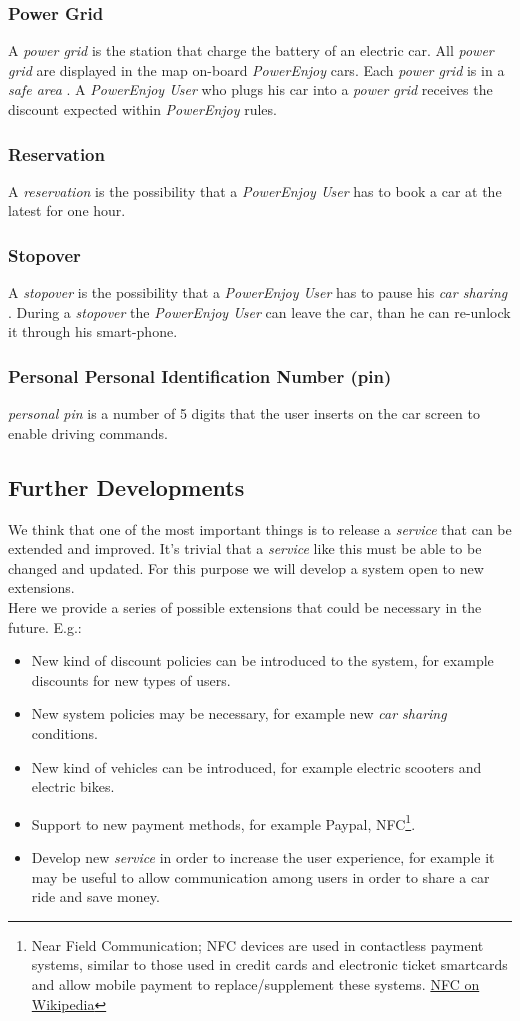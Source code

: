 \documentclass[english]{article}
\newcommand{\carsharing}{\textit {car sharing }}
\newcommand{\powerenjoy}{\textit{PowerEnjoy }}
\newcommand{\powerenjoyuser}{\textit{PowerEnjoy User }}
\newcommand{\service}{\textit{service }}
\newcommand{\safearea}{\textit{safe area }}
\newcommand{\powergrid}{\textit{power grid }}
\newcommand{\resevation}{\textit{reservation }}
\newcommand{\stopover}{\textit{stopover }}
\newcommand{\personalpin}{\textit{personal pin }}
\begin{document}
	\subsubsection{Power Grid}
		A \powergrid is the station that charge the battery of an electric car. All \powergrid are displayed in the map on-board \powerenjoy cars. Each \powergrid is in a \safearea. A \powerenjoyuser who plugs his car into a \powergrid receives the discount expected within \powerenjoy rules.
	\subsubsection{Reservation}
		A \resevation is the possibility that a \powerenjoyuser has to book a car at the latest for one hour.
	\subsubsection{Stopover}
		A \stopover is the possibility that a \powerenjoyuser has to pause his \carsharing. During a \stopover the \powerenjoyuser can leave the car, than he can re-unlock it through his smart-phone.
	\subsubsection{Personal  Personal Identification Number (pin)}
		 \personalpin is a number of 5 digits that the user inserts on the car screen to enable driving commands.

\subsection{Further Developments}
	We think that one of the most important things is to release a \service that can be extended and improved. It's trivial that a \service like this must be able to be changed and updated.
	For this purpose we will develop a system open to new extensions. \\
	Here we provide a series of possible extensions that could be necessary in the future.
	E.g.:
	\begin{itemize}
		\item New kind of discount policies can be introduced to the system, for example discounts for new types of users. 
		\item New system policies may be necessary, for example new \carsharing conditions.
		\item New kind of vehicles can be introduced, for example electric scooters and electric bikes.
		\item Support to new payment methods, for example Paypal\textregistered, NFC\footnote{Near Field Communication; NFC devices are used in contactless payment systems, similar to those used in credit cards and electronic ticket smartcards and allow mobile payment to replace/supplement these systems. \href{https://en.wikipedia.org/wiki/Near_field_communication}{NFC on Wikipedia}}.
		\item Develop new \service in order to increase the user experience, for example it may be useful to allow communication among users in order to share a car ride and save money.
	\end{itemize}
\end{document}
